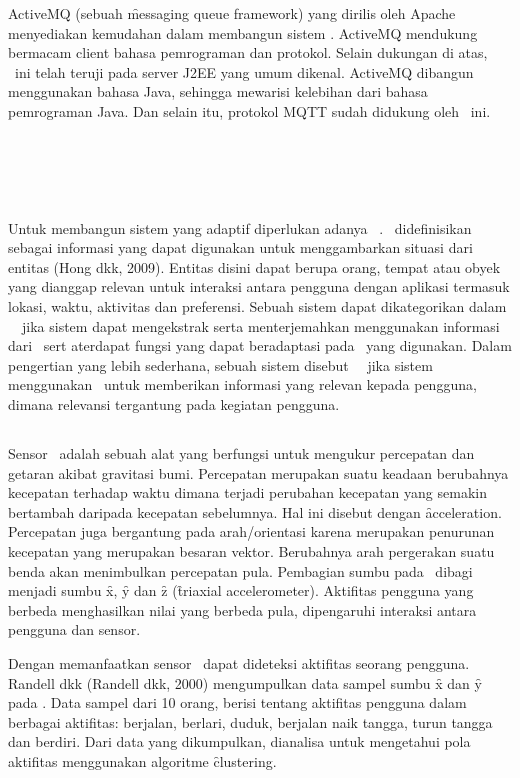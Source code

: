 ActiveMQ (sebuah \f{messaging queue framework}) yang dirilis oleh Apache
menyediakan kemudahan dalam membangun sistem \pubsub. ActiveMQ mendukung
bermacam client bahasa pemrograman dan protokol. Selain dukungan di atas,
\framework~ini telah teruji pada server J2EE yang umum dikenal. ActiveMQ
dibangun menggunakan bahasa Java, sehingga mewarisi kelebihan dari bahasa
pemrograman Java. Dan selain itu, protokol MQTT sudah didukung oleh
\framework~ini.

\section{\Context~\Aware}

Untuk membangun sistem yang adaptif diperlukan adanya \context~\aware.
\Context~didefinisikan sebagai informasi yang dapat digunakan untuk
menggambarkan situasi dari entitas (Hong dkk, 2009). Entitas disini dapat
berupa orang, tempat atau obyek yang dianggap relevan untuk interaksi antara
pengguna dengan aplikasi termasuk lokasi, waktu, aktivitas dan preferensi.
Sebuah sistem dapat dikategorikan dalam \context~\aware~jika sistem dapat
mengekstrak serta menterjemahkan menggunakan informasi dari \context~sert
aterdapat fungsi yang dapat beradaptasi pada \context~yang digunakan. Dalam
pengertian yang lebih sederhana, sebuah sistem disebut \context~\aware~jika
sistem menggunakan \context~untuk memberikan informasi yang relevan kepada
pengguna, dimana relevansi tergantung pada kegiatan pengguna.

\subsection{\Acc}

Sensor \acc~adalah sebuah alat yang berfungsi untuk mengukur percepatan dan
getaran akibat gravitasi bumi. Percepatan merupakan suatu keadaan berubahnya
kecepatan terhadap waktu dimana terjadi perubahan kecepatan yang semakin
bertambah daripada kecepatan sebelumnya.  Hal ini disebut dengan
\f{acceleration}. Percepatan juga bergantung pada arah/orientasi karena
merupakan penurunan kecepatan yang merupakan besaran vektor. Berubahnya arah
pergerakan suatu benda akan menimbulkan percepatan pula. Pembagian sumbu pada
\acc~dibagi menjadi sumbu \f{x}, \f{y} dan \f{z} (\f{triaxial accelerometer}).
Aktifitas pengguna yang berbeda menghasilkan nilai yang berbeda pula,
dipengaruhi interaksi antara pengguna dan sensor.

Dengan memanfaatkan sensor \acc~dapat dideteksi aktifitas seorang pengguna.
Randell dkk (Randell dkk, 2000) mengumpulkan data sampel sumbu \f{x} dan \f{y}
pada \acc. Data sampel dari 10 orang, berisi tentang aktifitas pengguna dalam
berbagai aktifitas: berjalan, berlari, duduk, berjalan naik tangga, turun
tangga dan berdiri. Dari data yang dikumpulkan, dianalisa untuk mengetahui pola
aktifitas menggunakan algoritme \f{clustering}.

